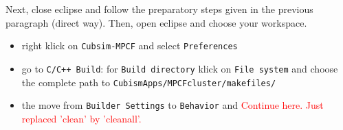 \documentclass[a4paper,10pt]{article}
\begin{document}
Next, close eclipse and follow the preparatory steps given in the previous paragraph (direct way).
Then, open eclipse and choose your workspace.
\begin{itemize}
\item right klick on \texttt{Cubsim-MPCF} and select \texttt{Preferences}
\item go to \texttt{C/C++ Build}: for \texttt{Build directory} klick on \texttt{File system} and choose the complete path to \texttt{CubismApps/MPCFcluster/makefiles/}
\item the move from \texttt{Builder Settings} to \texttt{Behavior} and \textcolor{red}{Continue here. Just replaced 'clean' by 'cleanall'.}
\end{itemize}
\end{document}
